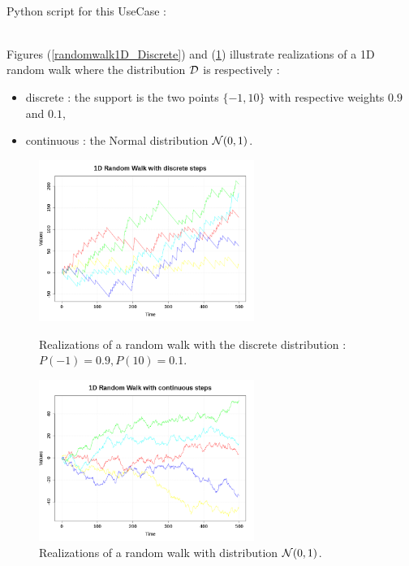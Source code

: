 \textspace\\
Python script for this UseCase :


\textspace\\
Figures (\ref{randomwalk1D_Discrete}) and (\ref{randomwalk1D_Continuous}) illustrate realizations of a 1D random walk where the distribution ${\mathcal D}$ is respectively :
\begin{itemize}
\item discrete :  the support is the two points $\{-1, 10\}$ with respective weights $0.9$ and $0.1$,
\item continuous : the Normal distribution ${\mathcal N}(0,1)$.
\end{itemize}



\begin{figure}[H]
  \begin{minipage}{9cm}
    \begin{center}
      \includegraphics[width=7cm]{Figures/randomwalk1D_discrete.png}
      \caption{Realizations of a random walk with the discrete distribution : $P(-1) = 0.9, P(10)=0.1$.}
      \label{randomwalk1D_Discrete}
    \end{center}
  \end{minipage}
  \hfill
  \begin{minipage}{9cm}
    \begin{center}
      \includegraphics[width=7cm]{Figures/randomwalk1D_continuous.png}
      \caption{Realizations of a random walk with distribution ${\mathcal N}(0,1)$.}
      \label{randomwalk1D_Continuous}
    \end{center}
  \end{minipage}
\end{figure}

